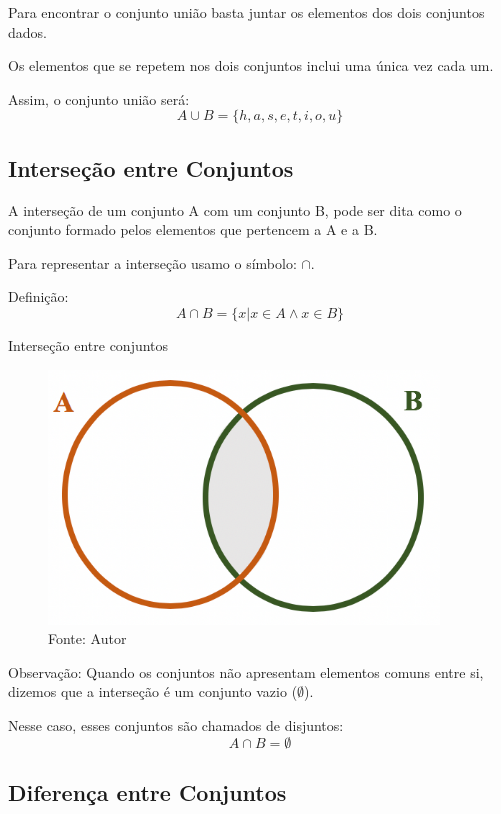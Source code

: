 \begin{multicols*}{2}
	Para encontrar o conjunto união basta juntar os elementos dos dois conjuntos dados.

	Os elementos que se repetem nos dois conjuntos inclui uma única vez cada um.

	Assim, o conjunto união será:
	\[A \cup B = \{h, a, s, e, t, i, o, u\}\]

	\subsection*{Interseção entre Conjuntos}

	A interseção de um conjunto A com um conjunto B, pode ser dita como o conjunto formado pelos elementos que pertencem a A e a B.

	Para representar a interseção usamo o símbolo: $ \cap $.

	Definição:
	\[A\cap B=\{x|x\in A\land x\in B\}\]

	Interseção entre conjuntos\\

	\begin{figure}[H]
		\centering
		\includegraphics[width=\columnwidth]{assets/Conjunto Intersecção.png}
		\caption*{Fonte: Autor}
	\end{figure}


	Observação: Quando os conjuntos não apresentam elementos comuns entre si, dizemos que a interseção é um conjunto vazio ($\emptyset$).

	Nesse caso, esses conjuntos são chamados de disjuntos:
	\[A \cap  B = \emptyset\]

	\subsection*{Diferença entre Conjuntos}


\end{multicols*}
